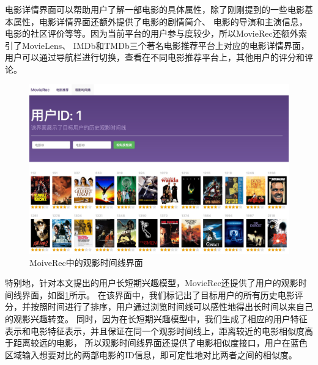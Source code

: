 电影详情界面可以帮助用户了解一部电影的具体属性，除了刚刚提到的一些电影基本属性，电影详情界面还额外提供了电影的剧情简介、
电影的导演和主演信息，电影的社区评价等等。因为当前平台的用户参与度较少，所以MovieRec还额外索引了MovieLens、
IMDb和TMDb三个著名电影推荐平台上对应的电影详情界面，用户可以通过导航栏进行切换，查看在不同电影推荐平台上，其他用户的评分和评论。

\begin{figure}[htbp]
\centering
\includegraphics[scale=0.2]{images/systemshow3.jpeg}
\caption{MoiveRec中的观影时间线界面}
\label{fig:systemshow3}
\end{figure}

特别地，针对本文提出的用户长短期兴趣模型，MovieRec还提供了用户的观影时间线界面，如图\ref{fig:systemshow3}所示。
在该界面中，我们标记出了目标用户的所有历史电影评分，并按照时间进行了排序，用户通过浏览时间线可以感性地得出长时间以来自己的观影兴趣转变。
同时，因为在长短期兴趣模型中，我们生成了相应的用户特征表示和电影特征表示，并且保证在同一个观影时间线上，距离较近的电影相似度高于距离较远的电影，
所以观影时间线界面还提供了电影相似度接口，用户在蓝色区域输入想要对比的两部电影的ID信息，即可定性地对比两者之间的相似度。


